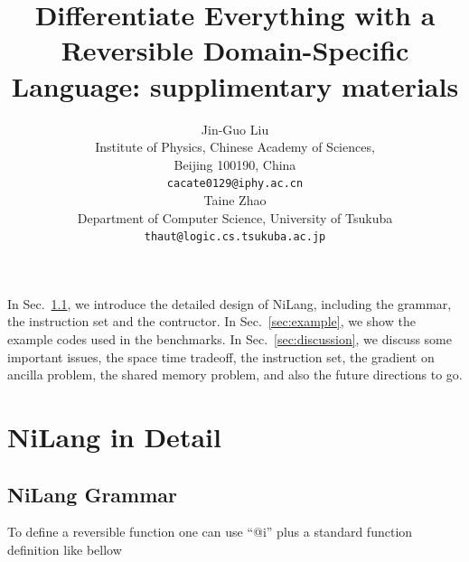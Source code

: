 \documentclass{article}
\newcommand{\<}{\langle}
\renewcommand{\>}{\rangle}
\newcommand{\Sec}[1]{Sec.~\ref{#1}}
\theoremstyle{definition}\newtheorem{definition}{\textit{Definition}}
\begin{document}
\title{Differentiate Everything with a Reversible Domain-Specific Language: supplimentary materials}

\author{Jin-Guo Liu\\
Institute of Physics, Chinese Academy of Sciences,\\Beijing 100190, China\\
\texttt{cacate0129@iphy.ac.cn}\\
\And
Taine Zhao\\
Department of Computer Science, University of Tsukuba\\
\texttt{thaut@logic.cs.tsukuba.ac.jp}\\
}



\maketitle

In \Sec{app:grammar}, we introduce the detailed design of NiLang, including the grammar, the instruction set and the contructor.
In \Sec{sec:example}, we show the example codes used in the benchmarks.
In \Sec{sec:discussion}, we discuss some important issues, the space time tradeoff, the instruction set, the gradient on ancilla problem, the shared memory problem, and also the future directions to go.

\section{NiLang in Detail}\label{app:detail}
\subsection{NiLang Grammar}\label{app:grammar}

To define a reversible function one can use ``@i'' plus a standard function definition like bellow
\end{document}

